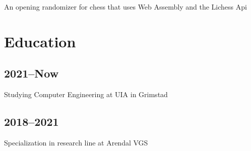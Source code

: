 \documentclass[12pt]{article}
\begin{document}
An opening randomizer for chess that uses Web Assembly and the
Lichess Api

\section{Education}

\subsection{2021–Now}

Studying Computer Engineering at UIA in Grimstad

\subsection{2018–2021}

Specialization in research line at Arendal VGS
\end{document}
